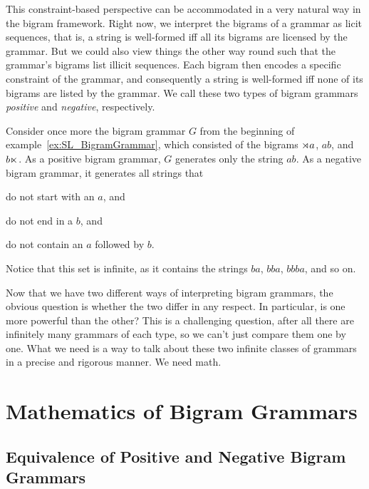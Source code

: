 This constraint-based perspective can be accommodated in a very natural way in the bigram framework.
Right now, we interpret the bigrams of a grammar as licit sequences, that is, a string is well-formed iff all its bigrams are licensed by the grammar. 
But we could also view things the other way round such that the grammar's bigrams list illicit sequences.
Each bigram then encodes a specific constraint of the grammar, and consequently a string is well-formed iff none of its bigrams are listed by the grammar.
We call these two types of bigram grammars \emph{positive} and \emph{negative}, respectively.
%
\begin{examplebox}
    Consider once more the bigram grammar $G$ from the beginning of example~\ref{ex:SL_BigramGrammar}, which consisted of the bigrams $\rtimes a$, $\mathit{ab}$, and $b \ltimes$.
    As a positive bigram grammar, $G$ generates only the string $\mathit{ab}$.
    As a negative bigram grammar, it generates all strings that
    \begin{itemize*}
        \item do not start with an $a$, and
        \item do not end in a $b$, and
        \item do not contain an $a$ followed by $b$.
    \end{itemize*}
    Notice that this set is infinite, as it contains the strings $\mathit{ba}$, $\mathit{bba}$, $\mathit{bbba}$, and so on.
\end{examplebox}

Now that we have two different ways of interpreting bigram grammars, the obvious question is whether the two differ in any respect.
In particular, is one more powerful than the other?
This is a challenging question, after all there are infinitely many grammars of each type, so we can't just compare them one by one.
What we need is a way to talk about these two infinite classes of grammars in a precise and rigorous manner.
We need math.


\section{Mathematics of Bigram Grammars}

\subsection{Equivalence of Positive and Negative Bigram Grammars}

